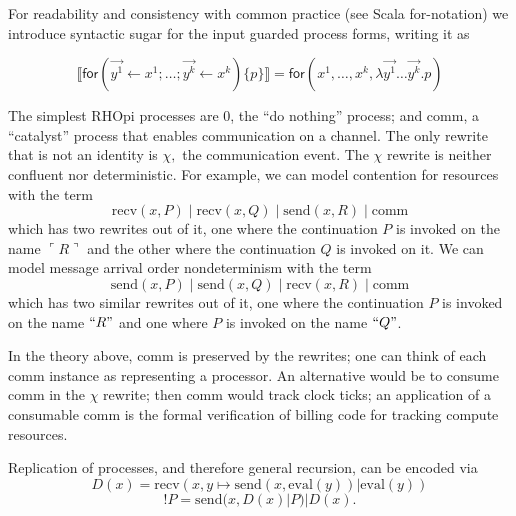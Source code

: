 \documentclass{llncs}
\newcommand{\interp}[1]{\llbracket #1 \rrbracket}
\newcommand{\send}{\mathrm{send}}
\newcommand{\recv}{\mathrm{recv}}
\newcommand{\comm}{\mathrm{comm}}
\renewcommand{\quote}[1]{``#1"}
\newcommand{\deref}[1]{\mathrm{eval}(#1)}
\newcommand{\lpquote}{\ulcorner}
\newcommand{\rpquote}{\urcorner}
\newcommand{\quotep}[1]{\lpquote #1 \rpquote}
\begin{document}
For readability and consistency with common practice (see Scala
for-notation) we introduce syntactic sugar for the input guarded
process forms, writing it as

\[\interp{\mathsf{for}( \vec{y^1} \leftarrow x^1;\ldots ; \vec{y^k} \leftarrow x^k)\{ p \}} = \mathsf{for}( x^1, \ldots, x^k, \lambda \vec{y^1} \ldots \vec{y^k}.p)\]

The simplest RHOpi processes are 0, the ``do nothing'' process; and comm, a ``catalyst'' process that enables communication on a channel.  The only rewrite that is not an identity is $\chi,$ the communication event.  The $\chi$ rewrite is neither confluent nor deterministic.  For example, we can model contention for resources with the term
\[ \recv(x, P)\;|\;\recv(x, Q)\;|\;\send(x,R)\;|\;\comm \]
which has two rewrites out of it, one where the continuation $P$ is invoked on the name $\quotep{R}$ and the other where the continuation $Q$ is invoked on it.  We can model message arrival order nondeterminism with the term
\[ \send(x, P)\;|\;\send(x, Q)\;|\;\recv(x,R)\;|\;\comm \]
which has two similar rewrites out of it, one where the continuation $P$ is invoked on the name $\quote{R}$ and one where $P$ is invoked on the name $\quote{Q}$.

In the theory above, comm is preserved by the rewrites; one can think of each comm instance as representing a processor.  An alternative would be to consume comm in the $\chi$ rewrite; then comm would track clock ticks; an application of a consumable comm is the formal verification of billing code for tracking compute resources.

Replication of processes, and therefore general recursion, can be encoded \cite{DBLP:journals/entcs/MeredithR05} via
\[D(x) = \recv(x, y\mapsto \send(x, \deref{y}) | \deref{y})\]
\[!P = \send(x, D(x) | P) | D(x).\]



\end{document}
